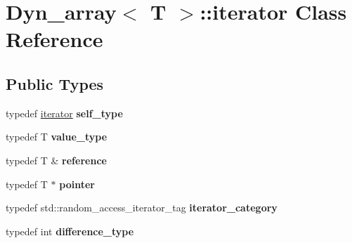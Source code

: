 \hypertarget{classDyn__array_1_1iterator}{}\section{Dyn\+\_\+array$<$ T $>$\+:\+:iterator Class Reference}
\label{classDyn__array_1_1iterator}
\subsection*{Public Types}
\begin{DoxyCompactItemize}
\item 
\mbox{\label{classDyn__array_1_1iterator_aa276ac9e0f18d9c908dfd3a293eb836e}} 
typedef \hyperlink{classDyn__array_1_1iterator}{iterator} {\bfseries self\+\_\+type}
\item 
\mbox{\label{classDyn__array_1_1iterator_a02f5c7aba2875834935fe199e192e46c}} 
typedef T {\bfseries value\+\_\+type}
\item 
\mbox{\label{classDyn__array_1_1iterator_ad9a03c51eee5902d4e87fcdac3c6b957}} 
typedef T \& {\bfseries reference}
\item 
\mbox{\label{classDyn__array_1_1iterator_aff147dfe471b7cc16bc5f3e96ab0973b}} 
typedef T $\ast$ {\bfseries pointer}
\item 
\mbox{\label{classDyn__array_1_1iterator_a9e1b1d3aaf0d887be7c1ed2cc2b3efc6}} 
typedef std\+::random\+\_\+access\+\_\+iterator\+\_\+tag {\bfseries iterator\+\_\+category}
\item 
\mbox{\label{classDyn__array_1_1iterator_a3031228c76067625fa94093801af4b97}} 
typedef int {\bfseries difference\+\_\+type}
\end{DoxyCompactItemize}
